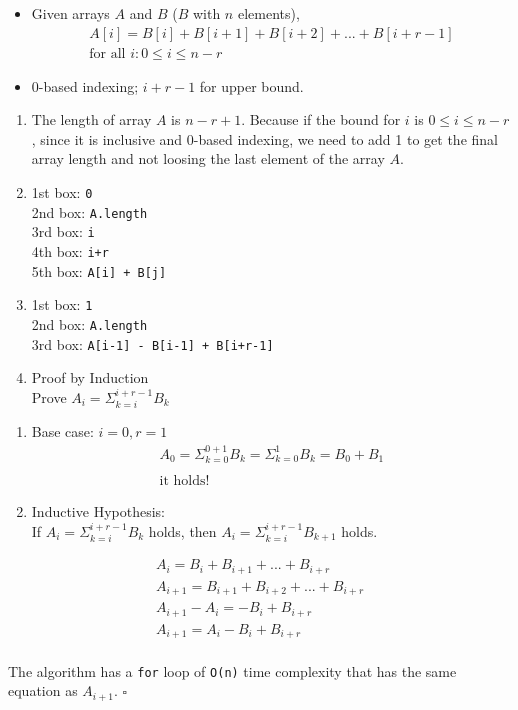 \documentclass[
]{article}
\newcommand{\passthrough}[1]{#1}
\providecommand{\tightlist}{%
  \setlength{\itemsep}{0pt}\setlength{\parskip}{0pt}}
\begin{document}
\begin{itemize}
\tightlist
\item
  Given arrays \(A\) and \(B\) (\(B\) with \(n\) elements),\\
  \[\begin{aligned}
  A[i] = B[i] + B[i+1] + B[i+2] + ... + B[i+r-1]\\
  \text{for all } i : 0 \leq  i \leq  n-r
  \end{aligned}
  \]
\item
  0-based indexing; \(i+r-1\) for upper bound.
\end{itemize}

\begin{enumerate}
\def\labelenumi{(\alph{enumi})}
\item
  The length of array \(A\) is \(n - r+1\). Because if the bound for
  \(i\) is \(0\leq i\leq n-r\), since it is inclusive and 0-based indexing, we
  need to add 1 to get the final array length and not loosing the last
  element of the array \(A\).
\item
  1st box: \passthrough{\lstinline!0!}\\
  2nd box: \passthrough{\lstinline!A.length!}\\
  3rd box: \passthrough{\lstinline!i!}\\
  4th box: \passthrough{\lstinline!i+r!}\\
  5th box: \passthrough{\lstinline!A[i] + B[j]!}
\item
  1st box: \passthrough{\lstinline!1!}\\
  2nd box: \passthrough{\lstinline!A.length!}\\
  3rd box: \passthrough{\lstinline!A[i-1] - B[i-1] + B[i+r-1]!}
\item
  Proof by Induction\\
  Prove \(A_i = \Sigma_{k=i}^{i+r-1} B_k\)
\end{enumerate}

\begin{enumerate}
\def\labelenumi{\arabic{enumi}.}
\item
  Base case: \(i=0, r=1\)\\
  \[
  \begin{array}{ll}
  A_0 = \Sigma_{k=0}^{0+1}B_k = \Sigma_{k=0}^{1}B_k = B_0+B_1\\\\
  \text{it holds!}
  \end{array}
  \]
\item
  Inductive Hypothesis: \\
  If \(A_i=\Sigma_{k=i}^{i+r-1}B_k\) holds, then
  \(A_i=\Sigma_{k=i}^{i+r-1}B_{k+1}\) holds.
\end{enumerate}

\[\begin{array}{ll}
A_i = B_i + B_{i+1} + ... + B_{i+r}\\
A_{i+1} = B_{i+1} + B_{i+2} + ... + B_{i+r}\\
A_{i+1}-A_i = -B_i + B_{i+r}\\
A_{i+1} = A_i-B_i+B_{i+r}
\end{array}
\]\\
The algorithm has a \passthrough{\lstinline!for!} loop of
\passthrough{\lstinline!O(n)!} time complexity that has the same
equation as \(A_{i+1}\). \(\square\)
\end{document}
